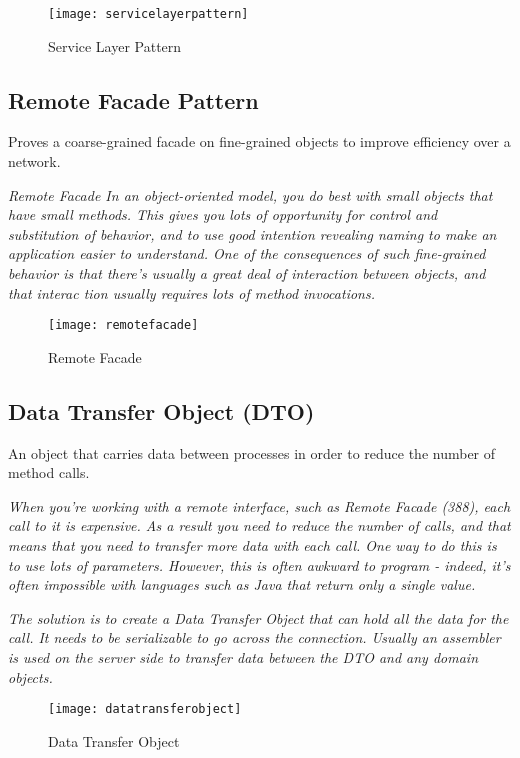 \begin{figure}[H]
  \center
  \texttt{[image: servicelayerpattern]}
  \caption{Service Layer Pattern}
\end{figure}

\subsection{Remote Facade Pattern}
Proves a coarse-grained facade on fine-grained objects to improve efficiency over a network.

\textit{Remote Facade In an object-oriented model, you do best with small objects that have small methods. This gives you lots of opportunity for control and substitution of behavior, and to use good intention revealing naming to make an application easier to understand. One of the consequences of such fine-grained behavior is that there's usually a great deal of interaction between objects, and that interac tion usually requires lots of method invocations.}
\begin{figure}[H]
  \center
  \texttt{[image: remotefacade]}
  \caption{Remote Facade}
\end{figure}

\subsection{Data Transfer Object (DTO)}
An object that carries data between processes in order to reduce the number of method calls.

\textit{When you’re working with a remote interface, such as Remote Facade (388), each call to it is expensive. As a result you need to reduce the number of calls, and that means that you need to transfer more data with each call. One way to do this is to use lots of parameters. However, this is often awkward to program - indeed, it’s often impossible with languages such as Java that return only a single value.}

\textit{The solution is to create a Data Transfer Object that can hold all the data for the call. It needs to be serializable to go across the connection. Usually an assembler is used on the server side to transfer data between the DTO and any domain objects.}
\begin{figure}[H]
  \center
  \texttt{[image: datatransferobject]}
  \caption{Data Transfer Object}
\end{figure}

